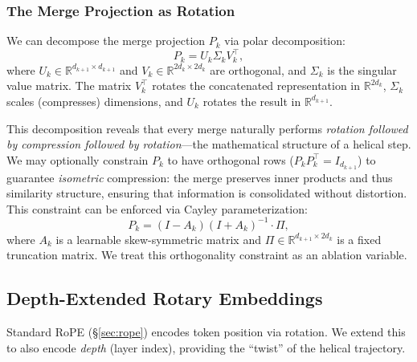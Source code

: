 \documentclass[11pt,a4paper]{article}
\theoremstyle{definition}
\theoremstyle{plain}
\theoremstyle{remark}
\newcommand{\R}{\mathbb{R}}
\begin{document}
\subsubsection{The Merge Projection as Rotation}
\label{sec:merge-rotation}

We can decompose the merge projection $P_k$ via polar decomposition:
\begin{equation}\label{eq:polar}
  P_k = U_k \Sigma_k V_k^\top, 
\end{equation}
where $U_k \in \R^{d_{k+1} \times d_{k+1}}$ and $V_k \in \R^{2d_k 
\times 2d_k}$ are orthogonal, and $\Sigma_k$ is the singular value matrix. 
The matrix $V_k^\top$ rotates the concatenated representation in 
$\R^{2d_k}$, $\Sigma_k$ scales (compresses) dimensions, and $U_k$ rotates 
the result in $\R^{d_{k+1}}$.

This decomposition reveals that every merge naturally performs 
\emph{rotation followed by compression followed by rotation}---the 
mathematical structure of a helical step. We may optionally constrain 
$P_k$ to have orthogonal rows ($P_k P_k^\top = I_{d_{k+1}}$) to 
guarantee \emph{isometric} compression: the merge preserves inner products 
and thus similarity structure, ensuring that information is consolidated 
without distortion. This constraint can be enforced via Cayley 
parameterization:
\begin{equation}\label{eq:cayley}
  P_k = (I - A_k)(I + A_k)^{-1} \cdot \Pi,
\end{equation}
where $A_k$ is a learnable skew-symmetric matrix and $\Pi \in 
\R^{d_{k+1} \times 2d_k}$ is a fixed truncation matrix. We treat this 
orthogonality constraint as an ablation variable.

\subsection{Depth-Extended Rotary Embeddings}\label{sec:depth-rope}

Standard RoPE (\S\ref{sec:rope}) encodes token position via rotation. 
We extend this to also encode \emph{depth} (layer index), providing the 
``twist'' of the helical trajectory.
\end{document}
